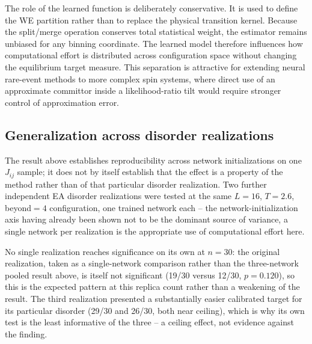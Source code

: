 \documentclass[a4paper,fleqn]{cas-sc}
\begin{document}
The role of the learned function is deliberately conservative. It is used to define the WE partition rather than to replace the physical transition kernel. Because the split/merge operation conserves total statistical weight, the estimator remains unbiased for any binning coordinate. The learned model therefore influences how computational effort is distributed across configuration space without changing the equilibrium target measure. This separation is attractive for extending neural rare-event methods to more complex spin systems, where direct use of an approximate committor inside a likelihood-ratio tilt would require stronger control of approximation error.

\subsection{Generalization across disorder realizations}\label{sec:disordergen}
The result above establishes reproducibility across network initializations on one $J_{ij}$ sample; it does not by itself establish that the effect is a property of the method rather than of that particular disorder realization. Two further independent EA disorder realizations were tested at the same $L=16$, $T=2.6$, beyond$=4$ configuration, one trained network each -- the network-initialization axis having already been shown not to be the dominant source of variance, a single network per realization is the appropriate use of computational effort here.

No single realization reaches significance on its own at $n=30$: the original realization, taken as a single-network comparison rather than the three-network pooled result above, is itself not significant (19/30 versus 12/30, $p=0.120$), so this is the expected pattern at this replica count rather than a weakening of the result. The third realization presented a substantially easier calibrated target for its particular disorder (29/30 and 26/30, both near ceiling), which is why its own test is the least informative of the three -- a ceiling effect, not evidence against the finding.
\end{document}
